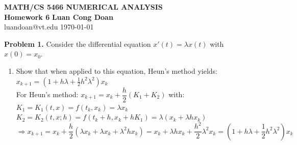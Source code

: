 \documentclass[14pt,a4paper]{article}
\begin{document}
\label{cover}
\begin{center}
	\vspace*{3cm}
	\large{\textbf{MATH/CS 5466 NUMERICAL ANALYSIS \\ Homework 6}}
	\vfill
	\textbf{Luan Cong Doan} \\ luandoan@vt.edu
	\vfill
	\today
\end{center}
\pagebreak

\label{Answer Sheet - Numerical Homework 6}
\doublespacing

\label{Problem 1}
\large\textbf{Problem 1.} Consider the differential equation $x'(t) = \lambda x(t)$ with $x(0) = x_0$.
\begin{enumerate}
	\label{1a}
	\item Show that when applied to this equation, Heun's method yields:\\
	\hspace*{5cm} $x_{k+1} = (1+h\lambda + \frac{1}{2}h^2\lambda^2)x_k$\\
	For Heun's method: $x_{k+1} = x_k + \dfrac{h}{2}(K_1 + K_2)$ with:\\  %
	\hspace*{1cm} $K_1 = K_1(t,x) = f(t_k,x_k) = \lambda x_k$\\
	\hspace*{1cm} $K_2 = K_2(t,x;h) = f(t_k+h,x_k+hK_1) = \lambda(x_k + \lambda hx_k)$\\
	$\Rightarrow x_{k+1} = x_k + \dfrac{h}{2}\left( \lambda x_k + \lambda x_k + \lambda^2 hx_k \right) = x_k + \lambda hx_k + \dfrac{h^2}{2}\lambda^2x_k = \left( 1+ h\lambda + \dfrac{1}{2}h^2\lambda^2\right)x_k$
	

\end{enumerate}
\end{document}
